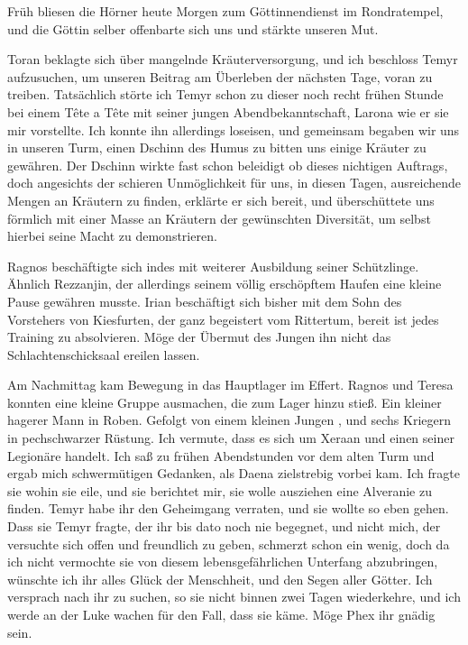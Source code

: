 Früh bliesen die Hörner heute Morgen zum Göttinnendienst im Rondratempel, und die Göttin selber offenbarte sich uns und stärkte unseren Mut.

Toran beklagte sich über mangelnde Kräuterversorgung, und ich beschloss Temyr aufzusuchen, um unseren Beitrag am Überleben der nächsten Tage, voran zu treiben. Tatsächlich störte ich Temyr schon zu dieser noch recht frühen Stunde bei einem Tête a Tête mit seiner jungen Abendbekanntschaft, Larona wie er sie mir vorstellte. Ich konnte ihn allerdings loseisen, und gemeinsam begaben wir uns in unseren Turm, einen Dschinn des Humus zu bitten uns einige Kräuter zu gewähren. Der Dschinn wirkte fast schon beleidigt ob dieses nichtigen Auftrags, doch angesichts der schieren Unmöglichkeit für uns, in diesen Tagen, ausreichende Mengen an Kräutern zu finden, erklärte er sich bereit, und überschüttete uns förmlich mit einer Masse an Kräutern der gewünschten Diversität, um selbst hierbei seine Macht zu demonstrieren.

Ragnos beschäftigte sich indes mit weiterer Ausbildung seiner Schützlinge. Ähnlich Rezzanjin, der allerdings seinem völlig erschöpftem Haufen eine kleine Pause gewähren musste. Irian beschäftigt sich bisher mit dem Sohn des Vorstehers von Kiesfurten, der ganz begeistert vom Rittertum, bereit ist jedes Training zu absolvieren. Möge der Übermut des Jungen ihn nicht das Schlachtenschicksaal ereilen lassen.

Am Nachmittag kam Bewegung in das Hauptlager im Effert. Ragnos und Teresa konnten eine kleine Gruppe ausmachen, die zum Lager hinzu stieß. Ein kleiner hagerer Mann in Roben. Gefolgt von einem kleinen Jungen , und sechs Kriegern in pechschwarzer Rüstung. Ich vermute, dass es sich um Xeraan und einen seiner Legionäre handelt. Ich saß zu frühen Abendstunden vor dem alten Turm und ergab mich schwermütigen Gedanken, als Daena zielstrebig vorbei kam. Ich fragte sie wohin sie eile, und sie berichtet mir, sie wolle ausziehen eine Alveranie zu finden. Temyr habe ihr den Geheimgang verraten, und sie wollte so eben gehen. Dass sie Temyr fragte, der ihr bis dato noch nie begegnet, und nicht mich, der versuchte sich offen und freundlich zu geben, schmerzt schon ein wenig, doch da ich nicht vermochte sie von diesem lebensgefährlichen Unterfang abzubringen, wünschte ich ihr alles Glück der Menschheit, und den Segen aller Götter. Ich versprach nach ihr zu suchen, so sie nicht binnen zwei Tagen wiederkehre, und ich werde an der Luke wachen für den Fall, dass sie käme. Möge Phex ihr gnädig sein.

